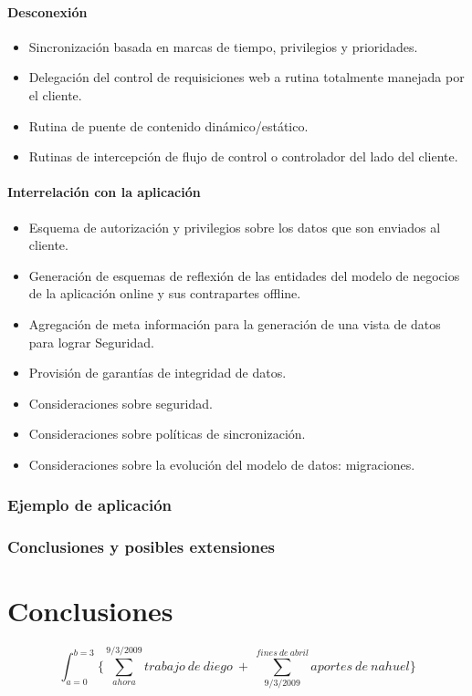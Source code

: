\documentclass[a4paper]{report}
\begin{document}
\subsubsection{Desconexión}
\begin{itemize}
  \item Sincronización basada en marcas de tiempo, privilegios y prioridades.
  \item Delegación del control de requisiciones web a rutina totalmente
  manejada por el cliente.
  \item Rutina de puente de contenido dinámico/estático.
  \item Rutinas de intercepción de flujo de control o controlador del lado del
  cliente.
\end{itemize}

\subsubsection{Interrelación con la aplicación}

\begin{itemize}
  \item Esquema de autorización y privilegios sobre los datos que son enviados
  al cliente.
  \item Generación de esquemas de reflexión de las entidades del modelo de
  negocios de la aplicación online y sus contrapartes offline.
  \item Agregación de meta información para la generación de una vista de datos
  para lograr Seguridad.
  \item Provisión de garantías de integridad de datos.
  \item Consideraciones sobre seguridad.
  \item Consideraciones sobre políticas de sincronización.
  \item Consideraciones sobre la evolución del modelo de datos: migraciones.
\end{itemize}

\subsection{Ejemplo de aplicación}
\subsection{Conclusiones y posibles extensiones}

\chapter{Conclusiones}
\label{ch:conc}
\begin{equation}
\int_{a=0}^{b=3}{\{
 \sum_{ahora}^{9/3/2009}{ trabajo\ de\ diego }\ +\ \sum_{9/3/2009}^
 {fines\ de\ abril}{aportes\ de\ nahuel}\}}
\end{equation}
\end{document}
